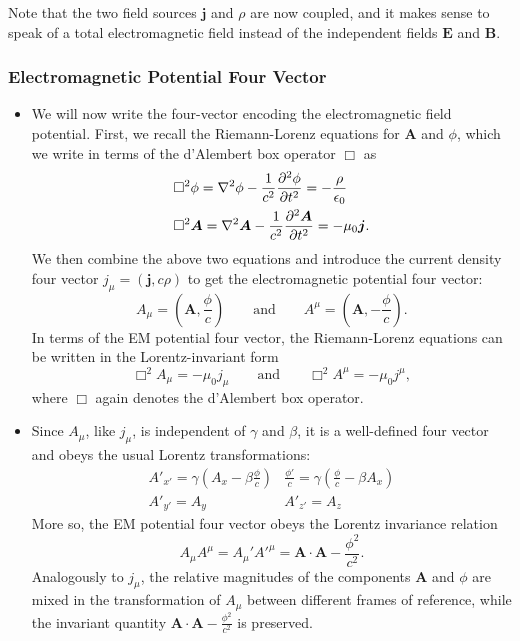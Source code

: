 \documentclass[11pt, a4paper]{article}
\newcommand{\eqtext}[1]{\qquad \text{#1} \qquad}
\renewcommand{\vec}[1]{\bm{#1}} %
\newcommand{\E}{\vec{E}} %
\newcommand{\B}{\vec{B}} %
\newcommand{\A}{\vec{A}} %
\newcommand{\ee}{\epsilon_{0}}  %
\newcommand{\mm}{\mu_{0}}  %
\renewcommand{\j}{\vec{j}}  %
\renewcommand{\laplacian}{\nabla^{2}}
\begin{document}
\begin{itemize}
    Note that the two field sources $ \j $ and $ \rho $ are now coupled, and it makes sense to speak of a total electromagnetic field instead of the independent fields $ \E $ and $ \B $.
	
\end{itemize}

\subsubsection{Electromagnetic Potential Four Vector}
\begin{itemize}
	\item We will now write the four-vector encoding the electromagnetic field potential. First, we recall the Riemann-Lorenz equations for $ \A  $ and $ \phi $, which we write in terms of the d'Alembert box operator $ \Box $ as
	\begin{align*}
		& \Box^{2}\phi = \laplacian \phi - \frac{1}{c^{2}}\pdv[2]{\phi}{t} = - \frac{\rho}{\ee}\\
		&\Box^{2} \A = \laplacian \A - \frac{1}{c^{2}} \pdv[2]{\A}{t} = - \mm \j.
	\end{align*}
    We then combine the above two equations and introduce the current density four vector $ j_{\mu} = (\j, c\rho) $ to get the electromagnetic potential four vector:
	\begin{equation*}
		A_{\mu} = \left (\A, \frac{\phi}{c}\right ) \eqtext{and} A^{\mu} = \left (\A, -\frac{\phi}{c}\right ).
	\end{equation*}
	In terms of the EM potential four vector, the Riemann-Lorenz equations can be written in the Lorentz-invariant form
	\begin{equation*}
		\Box ^{2}A_{\mu} = - \mm j_{\mu} \eqtext{and} \Box^{2}A^{\mu} = - \mm j^{\mu},
	\end{equation*}
    where $ \Box $ again denotes the d'Alembert box operator.
	
	\item Since $ A_{\mu} $, like $ j_{\mu} $, is independent of $ \gamma $ and $ \beta $, it is a well-defined four vector and obeys the usual Lorentz transformations:
	\begin{equation*}
        \begin{array}{ll}
            A'_{x'} = \gamma \left(A_{x} - \beta \frac{\phi}{c} \right) & \frac{\phi'}{c} = \gamma \left(\frac{\phi}{c} - \beta A_{x}\right) \\
            A'_{y'} = A_{y} & A'_{z'} = A_{z}
        \end{array}
	\end{equation*}
	More so, the EM potential four vector obeys the Lorentz invariance relation
	\begin{equation*}
		A_{\mu}A^{\mu} = A_{\mu}' A'^{\mu} = \A \cdot \A - \frac{\phi^{2}}{c^{2}}.
	\end{equation*}
    Analogously to $ j_{\mu} $, the relative magnitudes of the components $ \A $ and $ \phi $ are mixed in the transformation of $ A_{\mu} $ between different frames of reference, while the invariant quantity $ \A \cdot \A - \frac{\phi^{2}}{c^{2}} $ is preserved.
\end{itemize}
\end{document}
